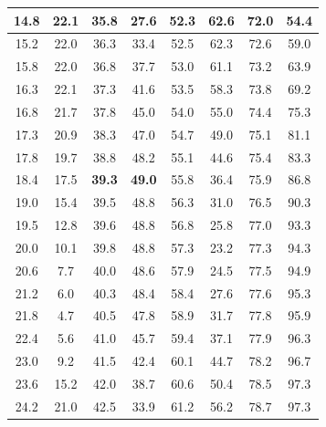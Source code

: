\documentclass[12pt,a4paper,UTF8]{ctexart}
\begin{document}
\begin{table}[htbp]
{\begin{tabular}{|c|c||c|c||c|c||c|c|}
\hline
     14.8  &      22.1  &      35.8  &      27.6  &      52.3  &      62.6  &      72.0  &      54.4  \\
\hline
     15.2  &      22.0  &      36.3  &      33.4  &      52.5  &      62.3  &      72.6  &      59.0  \\
\hline
     15.8  &      22.0  &      36.8  &      37.7  &      53.0  &      61.1  &      73.2  &      63.9  \\
\hline
     16.3  &      22.1  &      37.3  &      41.6  &      53.5  &      58.3  &      73.8  &      69.2  \\
\hline
     16.8  &      21.7  &      37.8  &      45.0  &      54.0  &      55.0  &      74.4  &      75.3  \\
\hline
     17.3  &      20.9  &      38.3  &      47.0  &      54.7  &      49.0  &      75.1  &      81.1  \\
\hline
     17.8  &      19.7  &      38.8  &      48.2  &      55.1  &      44.6  &      75.4  &      83.3  \\
\hline
     18.4  &      17.5  & \textbf{39.3}  & \textbf{49.0}  &      55.8  &      36.4  &      75.9  &      86.8  \\
\hline
     19.0  &      15.4  &      39.5  &      48.8  &      56.3  &      31.0  &      76.5  &      90.3  \\
\hline
     19.5  &      12.8  &      39.6  &      48.8  &      56.8  &      25.8  &      77.0  &      93.3  \\
\hline
     20.0  &      10.1  &      39.8  &      48.8  &      57.3  &      23.2  &      77.3  &      94.3  \\
\hline
     20.6  &       7.7  &      40.0  &      48.6  &      57.9  &      24.5  &      77.5  &      94.9  \\
\hline
     21.2  &       6.0  &      40.3  &      48.4  &      58.4  &      27.6  &      77.6  &      95.3  \\
\hline
     21.8  &       4.7  &      40.5  &      47.8  &      58.9  &      31.7  &      77.8  &      95.9  \\
\hline
     22.4  &       5.6  &      41.0  &      45.7  &      59.4  &      37.1  &      77.9  &      96.3  \\
\hline
     23.0  &       9.2  &      41.5  &      42.4  &      60.1  &      44.7  &      78.2  &      96.7  \\
\hline
     23.6  &      15.2  &      42.0  &      38.7  &      60.6  &      50.4  &      78.5  &      97.3  \\
\hline
     24.2  &      21.0  &      42.5  &      33.9  &      61.2  &      56.2  &      78.7  &      97.3  \\

\end{tabular}}
\end{table}
\end{document}
